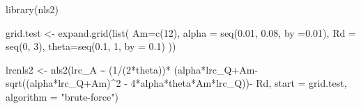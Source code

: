 \documentclass[
]{krantz}
\makeatletter
\newenvironment{Shaded}{\begin{snugshade}}{\end{snugshade}}
\newcommand{\AttributeTok}[1]{\textcolor[rgb]{0.77,0.63,0.00}{#1}}
\newcommand{\DecValTok}[1]{\textcolor[rgb]{0.00,0.00,0.81}{#1}}
\newcommand{\FloatTok}[1]{\textcolor[rgb]{0.00,0.00,0.81}{#1}}
\newcommand{\FunctionTok}[1]{\textcolor[rgb]{0.00,0.00,0.00}{#1}}
\newcommand{\NormalTok}[1]{#1}
\newcommand{\OtherTok}[1]{\textcolor[rgb]{0.56,0.35,0.01}{#1}}
\newcommand{\SpecialCharTok}[1]{\textcolor[rgb]{0.00,0.00,0.00}{#1}}
\newcommand{\StringTok}[1]{\textcolor[rgb]{0.31,0.60,0.02}{#1}}
\newenvironment{kframe}{%
\medskip{}
\setlength{\fboxsep}{.8em}
 \def\at@end@of@kframe{}%
 \ifinner\ifhmode%
  \def\at@end@of@kframe{\end{minipage}}%
  \begin{minipage}{\columnwidth}%
 \fi\fi%
 \def\FrameCommand##1{\hskip\@totalleftmargin \hskip-\fboxsep
 \colorbox{shadecolor}{##1}\hskip-\fboxsep
     \hskip-\linewidth \hskip-\@totalleftmargin \hskip\columnwidth}%
 \MakeFramed {\advance\hsize-\width
   \@totalleftmargin\z@ \linewidth\hsize
   \@setminipage}}%
 {\par\unskip\endMakeFramed%
 \at@end@of@kframe}
\renewenvironment{Shaded}{\begin{kframe}}{\end{kframe}}
\makeatother
\begin{document}
\begin{Shaded}
\begin{Highlighting}[]
\FunctionTok{library}\NormalTok{(nls2)}

\NormalTok{grid.test }\OtherTok{\textless{}{-}} \FunctionTok{expand.grid}\NormalTok{(}\FunctionTok{list}\NormalTok{(}
  \AttributeTok{Am=}\FunctionTok{c}\NormalTok{(}\DecValTok{12}\NormalTok{),}
  \AttributeTok{alpha =} \FunctionTok{seq}\NormalTok{(}\FloatTok{0.01}\NormalTok{, }\FloatTok{0.08}\NormalTok{, }\AttributeTok{by =}\FloatTok{0.01}\NormalTok{),}
  \AttributeTok{Rd =} \FunctionTok{seq}\NormalTok{(}\DecValTok{0}\NormalTok{, }\DecValTok{3}\NormalTok{),}
  \AttributeTok{theta=}\FunctionTok{seq}\NormalTok{(}\FloatTok{0.1}\NormalTok{, }\DecValTok{1}\NormalTok{, }\AttributeTok{by =} \FloatTok{0.1}\NormalTok{)}
\NormalTok{  ))}

\NormalTok{lrcnls2 }\OtherTok{\textless{}{-}} \FunctionTok{nls2}\NormalTok{(lrc\_A }\SpecialCharTok{\textasciitilde{}} 
\NormalTok{        (}\DecValTok{1}\SpecialCharTok{/}\NormalTok{(}\DecValTok{2}\SpecialCharTok{*}\NormalTok{theta))}\SpecialCharTok{*}
\NormalTok{        (alpha}\SpecialCharTok{*}\NormalTok{lrc\_Q}\SpecialCharTok{+}\NormalTok{Am}\SpecialCharTok{{-}}\FunctionTok{sqrt}\NormalTok{((alpha}\SpecialCharTok{*}\NormalTok{lrc\_Q}\SpecialCharTok{+}\NormalTok{Am)}\SpecialCharTok{\^{}}\DecValTok{2} \SpecialCharTok{{-}} 
                               \DecValTok{4}\SpecialCharTok{*}\NormalTok{alpha}\SpecialCharTok{*}\NormalTok{theta}\SpecialCharTok{*}\NormalTok{Am}\SpecialCharTok{*}\NormalTok{lrc\_Q))}\SpecialCharTok{{-}} 
\NormalTok{        Rd, }\AttributeTok{start =}\NormalTok{ grid.test, }\AttributeTok{algorithm =} \StringTok{"brute{-}force"}\NormalTok{)}
\end{Highlighting}
\end{Shaded}
\end{document}
